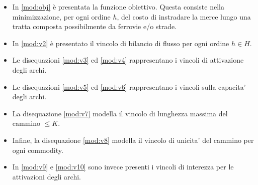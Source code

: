 \documentclass{article}
\begin{document}
\begin{itemize}
    \item In \eqref{mod:obj} è presentata la funzione obiettivo. Questa consiste nella minimizzazione, per ogni ordine $h$, del costo di instradare la merce lungo una tratta composta possibilmente da ferrovie e/o strade.
    \item In \eqref{mod:v2} è presentato il vincolo di bilancio di flusso per ogni ordine $h \in H$.
    \item Le disequazioni \eqref{mod:v3} ed \eqref{mod:v4} rappresentano i vincoli di attivazione degli archi.
    \item Le disequazioni \eqref{mod:v5} ed \eqref{mod:v6} rappresentano i vincoli sulla capacita' degli archi.
    \item La disequazione \eqref{mod:v7} modella il vincolo di lunghezza massima del cammino $\leq K$.
    \item Infine, la disequazione \eqref{mod:v8} modella il vincolo di unicita' del cammino per ogni commodity.
    \item In \eqref{mod:v9} e \eqref{mod:v10} sono invece presenti i vincoli di interezza per le attivazioni degli archi.

\end{itemize}
\end{document}
